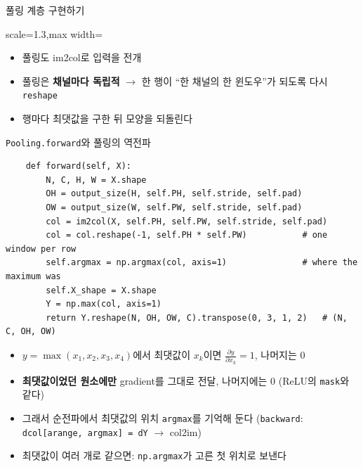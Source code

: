 \documentclass[aspectratio=169,11pt]{beamer}
\newcommand{\pd}[2]{\frac{\partial #1}{\partial #2}}
\def\cellsz{0.5}%
\newcommand{\numgrid}[4]{%
  \foreach \v [count=\k from 0] in {#4} {%
    \pgfmathtruncatemacro{\rr}{int(\k/#3)}%
    \pgfmathtruncatemacro{\cc}{mod(\k,#3)}%
    \draw[black!55] ({#1+\cc*\cellsz},{#2-\rr*\cellsz}) rectangle ++(\cellsz,-\cellsz);%
    \node[font=\small] at ({#1+\cc*\cellsz+0.5*\cellsz},{#2-\rr*\cellsz-0.5*\cellsz}) {\v};%
  }}
\begin{document}
\begin{frame}{풀링 계층 구현하기}
\centering
\begin{adjustbox}{scale=1.3,max width=\linewidth}
\end{adjustbox}
\raggedright
\vskip4mm
\begin{itemize}
\item 풀링도 im2col로 입력을 전개
\item 풀링은 \textbf{채널마다 독립적} $\to$ 한 행이 ``한 채널의 한 윈도우''가 되도록 다시 \texttt{reshape}
\item 행마다 최댓값을 구한 뒤 모양을 되돌린다
\end{itemize}
\end{frame}

\begin{frame}[fragile]{\texttt{Pooling.forward}와 풀링의 역전파}
\begin{lstlisting}
    def forward(self, X):
        N, C, H, W = X.shape
        OH = output_size(H, self.PH, self.stride, self.pad)
        OW = output_size(W, self.PW, self.stride, self.pad)
        col = im2col(X, self.PH, self.PW, self.stride, self.pad)
        col = col.reshape(-1, self.PH * self.PW)           # one window per row
        self.argmax = np.argmax(col, axis=1)               # where the maximum was
        self.X_shape = X.shape
        Y = np.max(col, axis=1)
        return Y.reshape(N, OH, OW, C).transpose(0, 3, 1, 2)   # (N, C, OH, OW)
\end{lstlisting}
\small
\begin{itemize}
\item $y=\max(x_1,x_2,x_3,x_4)$에서 최댓값이 $x_k$이면 $\pd{y}{x_k}=1$, 나머지는 $0$
\item \textbf{최댓값이었던 원소에만} gradient를 그대로 전달, 나머지에는 $0$ (ReLU의 \texttt{mask}와 같다)
\item 그래서 순전파에서 최댓값의 위치 \texttt{argmax}를 기억해 둔다 (\texttt{backward}: \texttt{dcol[arange, argmax] = dY} $\to$ col2im)
\item 최댓값이 여러 개로 같으면: \texttt{np.argmax}가 고른 첫 위치로 보낸다
\end{itemize}
\end{frame}
\end{document}
